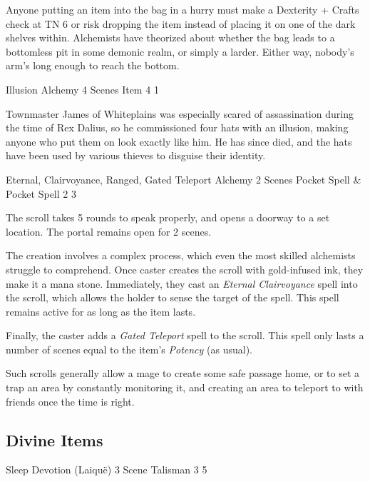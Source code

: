 \begin{multicols}{2}
Anyone putting an item into the bag in a hurry must make a Dexterity + Crafts check at TN 6 or risk dropping the item instead of placing it on one of the dark shelves within.  Alchemists have theorized about whether the bag leads to a bottomless pit in some demonic realm, or simply a larder.  Either way, nobody's arm's long enough to reach the bottom.

	{Illusion}%
	{Alchemy}%
	{4 Scenes}%
	{Item}%
	{4}%
	{1}%

Townmaster James of Whiteplains was especially scared of assassination during the time of Rex Dalius, so he commissioned four hats with an illusion, making anyone who put them on look exactly like him.
He has since died, and the hats have been used by various thieves to disguise their identity.

	{Eternal, Clairvoyance, Ranged, Gated Teleport}%
	{Alchemy}%
	{2 Scenes}%
	{Pocket Spell \& Pocket Spell}%
	{2}%
	{3}%

\label{portalscroll}

The scroll takes 5 rounds to speak properly, and opens a doorway to a set location.
The portal remains open for 2 scenes.

The creation involves a complex process, which even the most skilled alchemists struggle to comprehend.
Once caster creates the scroll with gold-infused ink, they make it a mana stone.
Immediately, they cast an \textit{Eternal Clairvoyance} spell into the scroll, which allows the holder to sense the target of the spell.
This spell remains active for as long as the item lasts.

Finally, the caster adds a \textit{Gated Teleport} spell to the scroll.
This spell only lasts a number of scenes equal to the item's \textit{Potency} (as usual).

Such scrolls generally allow a mage to create some safe passage home, or to set a trap an area by constantly monitoring it, and creating an area to teleport to with friends once the time is right.

\subsection{Divine Items}

	{Sleep}%
	{Devotion (Laiqu\"{e})}%
	{3 Scene}%
	{Talisman}%
	{3}%
	{5}%


\end{multicols}
